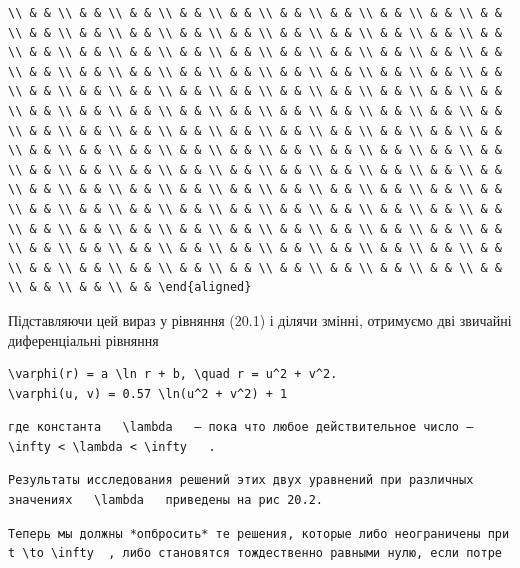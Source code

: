 \documentclass[
  ukrainian,
]{article}
\begin{document}
\begin{verbatim}
\\ & & \\ & & \\ & & \\ & & \\ & & \\ & & \\ & & \\ & & \\ & & \\ & & \\ & & \\ & & \\ & & \\ & & \\ & & \\ & & \\ & & \\ & & \\ & & \\ & & \\ & & \\ & & \\ & & \\ & & \\ & & \\ & & \\ & & \\ & & \\ & & \\ & & \\ & & \\ & & \\ & & \\ & & \\ & & \\ & & \\ & & \\ & & \\ & & \\ & & \\ & & \\ & & \\ & & \\ & & \\ & & \\ & & \\ & & \\ & & \\ & & \\ & & \\ & & \\ & & \\ & & \\ & & \\ & & \\ & & \\ & & \\ & & \\ & & \\ & & \\ & & \\ & & \\ & & \\ & & \\ & & \\ & & \\ & & \\ & & \\ & & \\ & & \\ & & \\ & & \\ & & \\ & & \\ & & \\ & & \\ & & \\ & & \\ & & \\ & & \\ & & \\ & & \\ & & \\ & & \\ & & \\ & & \\ & & \\ & & \\ & & \\ & & \\ & & \\ & & \\ & & \\ & & \\ & & \\ & & \\ & & \\ & & \\ & & \\ & & \\ & & \\ & & \\ & & \\ & & \\ & & \\ & & \\ & & \\ & & \\ & & \\ & & \\ & & \\ & & \\ & & \\ & & \\ & & \\ & & \\ & & \\ & & \\ & & \\ & & \\ & & \\ & & \\ & & \\ & & \\ & & \\ & & \\ & & \\ & & \\ & & \\ & & \\ & & \\ & & \\ & & \\ & & \\ & & \\ & & \\ & & \\ & & \\ & & \\ & & \\ & & \\ & & \\ & & \end{aligned}
\end{verbatim}

Підставляючи цей вираз у рівняння (20.1) і ділячи змінні, отримуємо дві
звичайні диференціальні рівняння

\begin{verbatim}
\varphi(r) = a \ln r + b, \quad r = u^2 + v^2.
\varphi(u, v) = 0.57 \ln(u^2 + v^2) + 1
\end{verbatim}

\begin{verbatim}
где константа   \lambda   — пока что любое действительное число —   \infty < \lambda < \infty   .
\end{verbatim}

\begin{verbatim}
Результаты исследования решений этих двух уравнений при различных значениях   \lambda   приведены на рис 20.2.
\end{verbatim}

\begin{verbatim}
Теперь мы должны *опбросить* те решения, которые либо неограничены при   t \to \infty  , либо становятся тождественно равными нулю, если потре
\end{verbatim}
\end{document}
